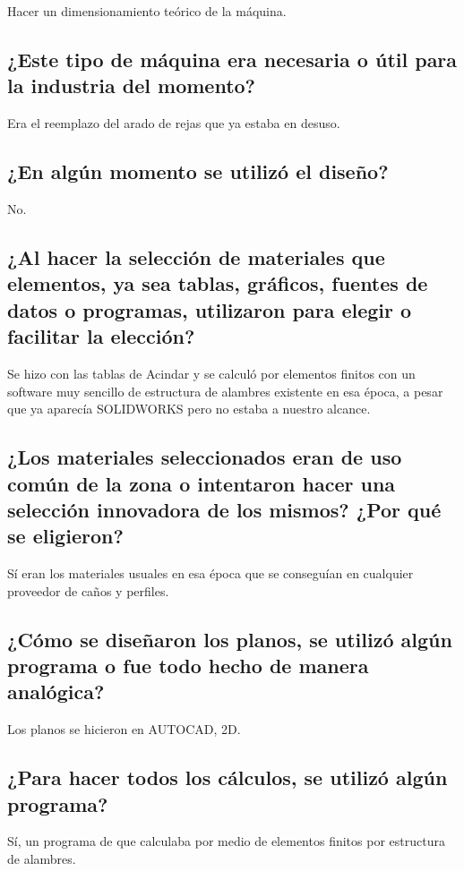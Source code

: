 \documentclass[15pt,a4paper]{article}
\begin{document}
Hacer un dimensionamiento teórico de la máquina.

\subsection{¿Este tipo de máquina era necesaria o útil para la industria del momento?}

Era el reemplazo del arado de rejas que ya estaba en desuso.

\subsection{¿En algún momento se utilizó el diseño?}

No.

\subsection{¿Al hacer la selección de materiales que elementos, ya sea tablas, gráficos, fuentes de datos o programas, utilizaron para elegir o facilitar la elección?}

Se hizo con las tablas de Acindar y se calculó por elementos finitos con un software muy sencillo de estructura de alambres existente en esa época, a pesar que ya aparecía SOLIDWORKS pero no estaba a nuestro alcance.

\subsection{¿Los materiales seleccionados eran de uso común de la zona o intentaron hacer una selección innovadora de los mismos? ¿Por qué se eligieron?}

Sí eran los materiales usuales en esa época que se conseguían en cualquier proveedor de caños y perfiles.

\subsection{¿Cómo se diseñaron los planos, se utilizó algún programa o fue todo hecho de manera analógica?}

Los planos se hicieron en AUTOCAD, 2D.

\subsection{¿Para hacer todos los cálculos, se utilizó algún programa?}

Sí, un programa de que calculaba por medio de elementos finitos por estructura de alambres.
\end{document}

